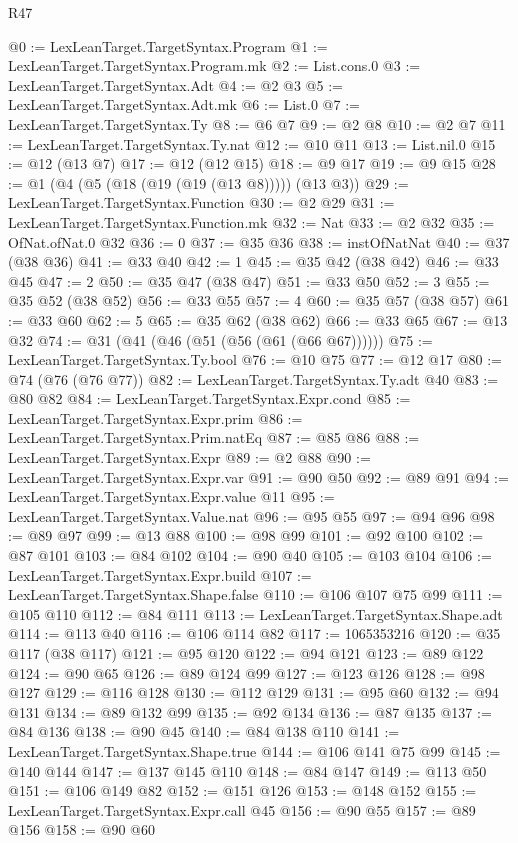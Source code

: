 \begin{lexlean}{R47}
\begin{coremodule}
@0 := LexLeanTarget.TargetSyntax.Program
@1 := LexLeanTarget.TargetSyntax.Program.mk
@2 := List.cons.{0}
@3 := LexLeanTarget.TargetSyntax.Adt
@4 := @2 @3
@5 := LexLeanTarget.TargetSyntax.Adt.mk
@6 := List.{0}
@7 := LexLeanTarget.TargetSyntax.Ty
@8 := @6 @7
@9 := @2 @8
@10 := @2 @7
@11 := LexLeanTarget.TargetSyntax.Ty.nat
@12 := @10 @11
@13 := List.nil.{0}
@15 := @12 (@13 @7)
@17 := @12 (@12 @15)
@18 := @9 @17
@19 := @9 @15
@28 := @1 (@4 (@5 (@18 (@19 (@19 (@13 @8))))) (@13 @3))
@29 := LexLeanTarget.TargetSyntax.Function
@30 := @2 @29
@31 := LexLeanTarget.TargetSyntax.Function.mk
@32 := Nat
@33 := @2 @32
@35 := OfNat.ofNat.{0} @32
@36 := 0
@37 := @35 @36
@38 := instOfNatNat
@40 := @37 (@38 @36)
@41 := @33 @40
@42 := 1
@45 := @35 @42 (@38 @42)
@46 := @33 @45
@47 := 2
@50 := @35 @47 (@38 @47)
@51 := @33 @50
@52 := 3
@55 := @35 @52 (@38 @52)
@56 := @33 @55
@57 := 4
@60 := @35 @57 (@38 @57)
@61 := @33 @60
@62 := 5
@65 := @35 @62 (@38 @62)
@66 := @33 @65
@67 := @13 @32
@74 := @31 (@41 (@46 (@51 (@56 (@61 (@66 @67))))))
@75 := LexLeanTarget.TargetSyntax.Ty.bool
@76 := @10 @75
@77 := @12 @17
@80 := @74 (@76 (@76 @77))
@82 := LexLeanTarget.TargetSyntax.Ty.adt @40
@83 := @80 @82
@84 := LexLeanTarget.TargetSyntax.Expr.cond
@85 := LexLeanTarget.TargetSyntax.Expr.prim
@86 := LexLeanTarget.TargetSyntax.Prim.natEq
@87 := @85 @86
@88 := LexLeanTarget.TargetSyntax.Expr
@89 := @2 @88
@90 := LexLeanTarget.TargetSyntax.Expr.var
@91 := @90 @50
@92 := @89 @91
@94 := LexLeanTarget.TargetSyntax.Expr.value @11
@95 := LexLeanTarget.TargetSyntax.Value.nat
@96 := @95 @55
@97 := @94 @96
@98 := @89 @97
@99 := @13 @88
@100 := @98 @99
@101 := @92 @100
@102 := @87 @101
@103 := @84 @102
@104 := @90 @40
@105 := @103 @104
@106 := LexLeanTarget.TargetSyntax.Expr.build
@107 := LexLeanTarget.TargetSyntax.Shape.false
@110 := @106 @107 @75 @99
@111 := @105 @110
@112 := @84 @111
@113 := LexLeanTarget.TargetSyntax.Shape.adt
@114 := @113 @40
@116 := @106 @114 @82
@117 := 1065353216
@120 := @35 @117 (@38 @117)
@121 := @95 @120
@122 := @94 @121
@123 := @89 @122
@124 := @90 @65
@126 := @89 @124 @99
@127 := @123 @126
@128 := @98 @127
@129 := @116 @128
@130 := @112 @129
@131 := @95 @60
@132 := @94 @131
@134 := @89 @132 @99
@135 := @92 @134
@136 := @87 @135
@137 := @84 @136
@138 := @90 @45
@140 := @84 @138 @110
@141 := LexLeanTarget.TargetSyntax.Shape.true
@144 := @106 @141 @75 @99
@145 := @140 @144
@147 := @137 @145 @110
@148 := @84 @147
@149 := @113 @50
@151 := @106 @149 @82
@152 := @151 @126
@153 := @148 @152
@155 := LexLeanTarget.TargetSyntax.Expr.call @45
@156 := @90 @55
@157 := @89 @156
@158 := @90 @60

\end{coremodule}
\end{lexlean}
